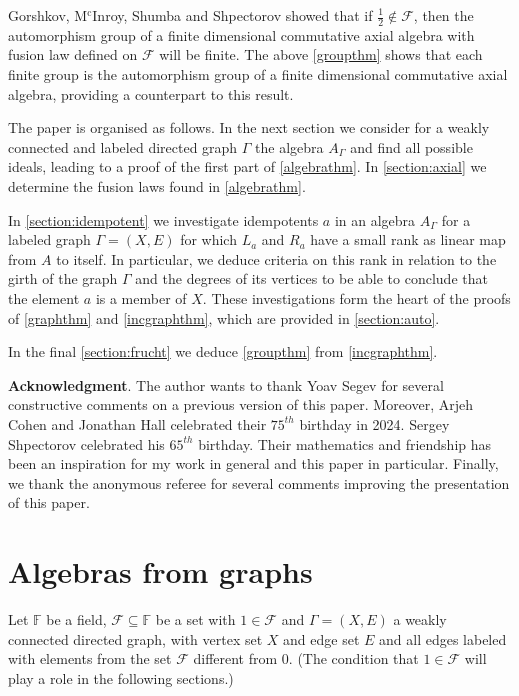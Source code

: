 \documentclass[oneside,a4paper]{amsart} %
\theoremstyle{definition}
\begin{document}
Gorshkov, M$^\mathrm{c}$Inroy, Shumba and Shpectorov showed \cite{gorshkov2023automorphism} that if $\frac{1}{2}\not\in \mathcal{F}$,
then the automorphism group of a finite dimensional commutative axial algebra with  fusion law defined on $\mathcal{F}$ will be finite.
The above \cref{groupthm} shows  that each finite group is the automorphism group of a finite dimensional commutative axial algebra,
providing a counterpart to this result.

 

The paper is organised as follows.
In the next section we consider for a weakly connected and labeled directed graph $\Gamma$ the algebra $A_\Gamma$ and find all possible ideals, leading to a proof of the first part of \cref{algebrathm}.
In \cref{section:axial} we determine the fusion laws found in \cref{algebrathm}.

In \cref{section:idempotent} we investigate idempotents $a$ in an algebra $A_\Gamma$ for a labeled graph $\Gamma=(X,E)$ for which ${L}_a$ and ${R}_a$ have a small rank as linear map from $A$ to itself.
In particular, we deduce criteria on this rank in relation to the girth of the graph $\Gamma$ and the degrees  of its vertices to be able to conclude that the element $a$ is a member of $X$.  
These investigations form the heart of the proofs of \cref{graphthm} and \cref{incgraphthm}, which are provided in \cref{section:auto}.

In the final \cref{section:frucht} we deduce  \cref{groupthm}  from \cref{incgraphthm}.


\medskip
\noindent
{\bf Acknowledgment}. The author wants to thank Yoav Segev for several constructive comments on a previous version of this paper.
Moreover, Arjeh Cohen and Jonathan Hall celebrated their $75^{th}$ birthday in 2024. Sergey Shpectorov celebrated his $65^{th}$ birthday.
Their mathematics and friendship has been an inspiration for my work in general and this paper in particular.
Finally, we thank the anonymous referee for several comments improving the presentation of this paper. 

\section{Algebras from graphs}
\label{section:algebra}
Let $\mathbb{F}$ be a field, $\mathcal{F}\subseteq \mathbb{F}$ be a set  with $1\in \mathcal{F}$
and $\Gamma=(X,E)$  a weakly connected directed graph, with vertex set $X$ and edge set $E$ and all edges  labeled
with  elements from the set $\mathcal{F}$ different from $0$. (The condition that $1\in \mathcal{F}$ will play a role in the following sections.)
\end{document}
